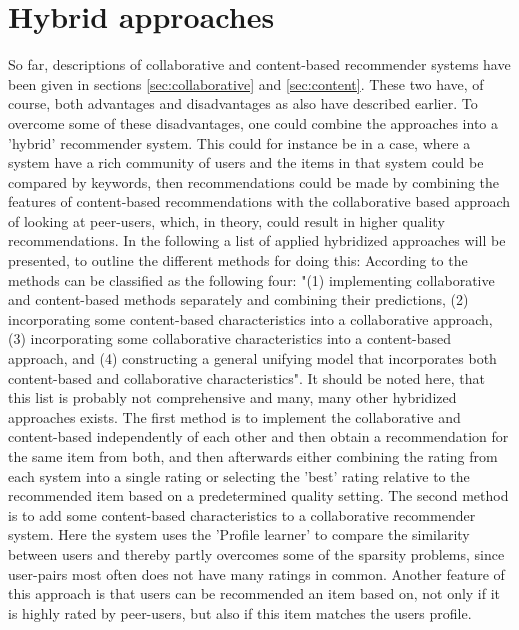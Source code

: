 \newpage
\section{Hybrid approaches}
So far, descriptions of collaborative and content-based recommender systems have been given in sections \ref{sec:collaborative} and \ref{sec:content}. These two have, of course, both advantages and disadvantages as also have described earlier. To overcome some of these disadvantages, one could combine the approaches into a 'hybrid' recommender system. This could for instance be in a case, where a system have a rich community of users and the items in that system could be compared by keywords, then recommendations could be made by combining the features of content-based recommendations with the collaborative based approach of looking at peer-users, which, in theory, could result in higher quality recommendations.
In the following a list of applied hybridized approaches will be presented, to outline the different methods for doing this:
According to \citet[p. 20-22]{TowardsTheNextGenerationOfRs} the methods can be classified as the following four: "(1) implementing collaborative and content-based methods separately and combining their predictions, (2) incorporating some content-based characteristics into a collaborative approach, (3) incorporating some collaborative characteristics into a content-based approach, and (4) constructing a general unifying model that incorporates both content-based and collaborative characteristics". It should be noted here, that this list is probably not comprehensive and many, many other hybridized approaches exists. \newline
The first method is to implement the collaborative and content-based independently of each other and then obtain a recommendation for the same item from both, and then afterwards either combining the rating from each system into a single rating or selecting the 'best' rating relative to the recommended item based on a predetermined quality setting. \newline
The second method is to add some content-based characteristics to a collaborative recommender system. Here the system uses the 'Profile learner' to compare the similarity between users and thereby partly overcomes some of the sparsity problems, since user-pairs most often does not have many ratings in common. Another feature of this approach is that users can be recommended an item based on, not only if it is highly rated by peer-users, but also if this item matches the users profile. \newline
